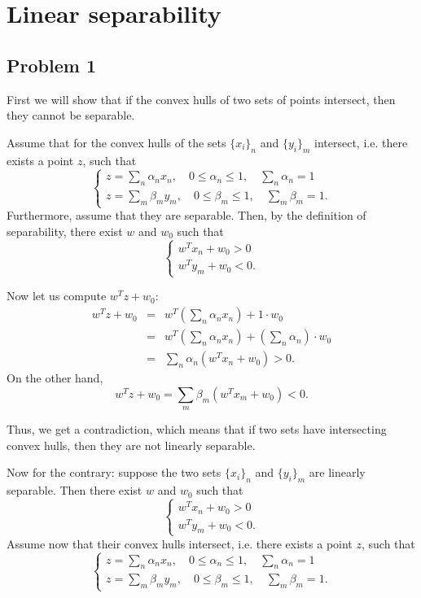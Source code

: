\section{Linear separability}

\subsection*{Problem 1}

First we will show that if the convex hulls of two sets of points intersect, then they cannot be 
separable.

Assume that for the convex hulls of the sets $\{x_i\}_n$ and $\{y_i\}_m$ intersect, i.e. there 
exists a point $z$, such that 
\[\begin{cases} 
z = \sum_n\alpha_nx_n, \quad 0 \leq \alpha_n \leq 1, \quad\sum_n\alpha_n = 1\\ 
z = \sum_m\beta_my_m , \quad 0 \leq \beta_m  \leq 1, \quad\sum_m\beta_m  = 1.
\end{cases}\] Furthermore, assume that they are separable. Then, by the definition of separability, 
there exist $w$ and $w_0$ such that 
\[\begin{cases}w^Tx_n + w_0 > 0 \\ w^Ty_m + w_0 < 0.\end{cases}\] 

Now let us compute $w^Tz+w_0$:
\begin{eqnarray*}
w^Tz + w_0 &=& w^T\left(\sum_n\alpha_nx_n\right) + 1\cdot w_0 \\
           &=& w^T\left(\sum_n\alpha_nx_n\right) + \left(\sum_n\alpha_n\right)\cdot w_0 \\
           &=& \sum_n\alpha_n\left(w^Tx_n + w_0\right) > 0.
\end{eqnarray*}
On the other hand,
\begin{equation*}
w^Tz + w_0 = \sum_m\beta_m\left(w^Tx_m + w_0\right) < 0.
\end{equation*}

Thus, we get a contradiction, which means that if two sets have intersecting convex hulls, then
they are not linearly separable.


Now for the contrary: suppose the two sets $\{x_i\}_n$ and $\{y_i\}_m$ are linearly separable. Then
there exist $w$ and $w_0$ such that 
\[\begin{cases}w^Tx_n + w_0 > 0 \\ w^Ty_m + w_0 < 0.\end{cases}\] 
Assume now that their convex hulls intersect, i.e. there 
exists a point $z$, such that 
\[\begin{cases} 
z = \sum_n\alpha_nx_n, \quad 0 \leq \alpha_n \leq 1, \quad\sum_n\alpha_n = 1\\ 
z = \sum_m\beta_my_m , \quad 0 \leq \beta_m  \leq 1, \quad\sum_m\beta_m  = 1.  \end{cases}\]

